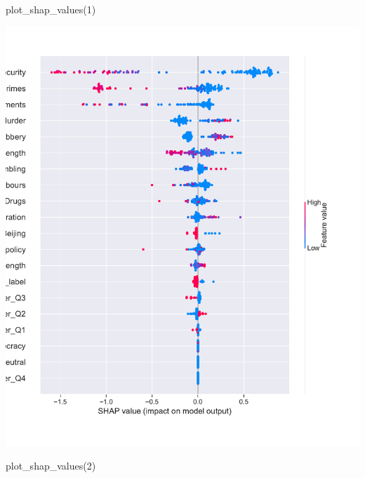 \documentclass[a4paper, oneside]{report}
\newenvironment{Shaded}{\begin{snugshade}}{\end{snugshade}}
\newcommand{\DecValTok}[1]{\textcolor[rgb]{0.00,0.00,0.81}{#1}}
\newcommand{\NormalTok}[1]{#1}
\renewenvironment{Shaded}
{
  \vspace{4pt}%
  \begin{snugshade}%
}{%
  \end{snugshade}%
  \vspace{4pt}%
}
\begin{document}
\begin{Shaded}
\begin{Highlighting}[]
\NormalTok{plot\_shap\_values(}\DecValTok{1}\NormalTok{)}
\end{Highlighting}
\end{Shaded}

\includegraphics{versions/Chin_Chapter_4_2022-01-10_files/figure-latex/unnamed-chunk-15-5.pdf}

\begin{Shaded}
\begin{Highlighting}[]
\NormalTok{plot\_shap\_values(}\DecValTok{2}\NormalTok{)}
\end{Highlighting}
\end{Shaded}
\end{document}
